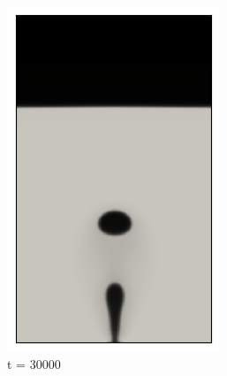 \begin{figure}[H]
\begin{subfigure}{0.25\textwidth}
		\includegraphics[width=\linewidth]{figs/cap4/cuda_bb_760_s30}
		\caption{t = 30000}
		\label{fig:5}
	\end{subfigure}\hfil 
	\begin{subfigure}{0.25\textwidth}

\end{subfigure}
\end{figure}
